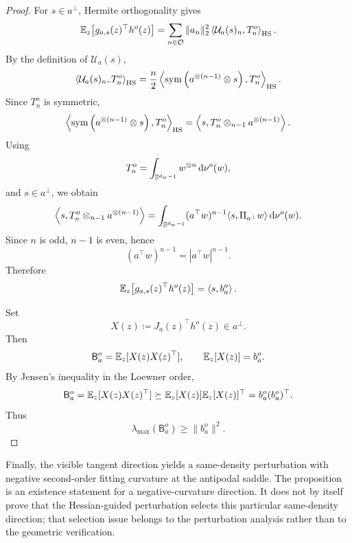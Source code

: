 \begin{proof}
For \(s\in a^\perp\), Hermite orthogonality gives
\[
    \mathbb{E}_z\bigl[g_{a,s}(z)^\top h^o(z)\bigr]
    =
    \sum_{n\in\mathcal O}
    \|a_n\|_2^2
    \left\langle
        \mathcal U_a(s)_n,T_n^o
    \right\rangle_{\mathrm{HS}}.
\]
By the definition of \(\mathcal U_a(s)\),
\[
    \left\langle
        \mathcal U_a(s)_n,T_n^o
    \right\rangle_{\mathrm{HS}}
    =
    \frac n2
    \left\langle
        \mathrm{sym}\left({a^{\otimes(n-1)}\otimes s}\right),
        T_n^o
    \right\rangle_{\mathrm{HS}}.
\]
Since \(T_n^o\) is symmetric,
\[
    \left\langle
        \mathrm{sym}\left({a^{\otimes(n-1)}\otimes s}\right),
        T_n^o
    \right\rangle_{\mathrm{HS}}
    =
    \left\langle
        s,
        T_n^o\otimes_{n-1}a^{\otimes(n-1)}
    \right\rangle.
\]
Using
\[
    T_n^o
    =
    \int_{\mathbb{S}^{d_w-1}} w^{\otimes n}\,\dd\nu^o(w),
\]
and \(s\in a^\perp\), we obtain
\[
    \left\langle
        s,
        T_n^o\otimes_{n-1}a^{\otimes(n-1)}
    \right\rangle
    =
    \int_{\mathbb{S}^{d_w-1}}
    (a^\top w)^{n-1}
    \langle s,\Pi_{a^\perp}w\rangle
    \,\dd\nu^o(w).
\]
Since \(n\) is odd, \(n-1\) is even, hence
\[
    (a^\top w)^{n-1}
    =
    |a^\top w|^{n-1}.
\]
Therefore
\[
    \mathbb{E}_z\bigl[g_{a,s}(z)^\top h^o(z)\bigr]
    =
    \left\langle s,b_a^o\right\rangle.
\]

Set
\[
    X(z)\coloneq J_a(z)^\top h^o(z)\in a^\perp.
\]
Then
\[
    \mathsf B_a^o=\mathbb{E}_z[X(z)X(z)^\top],
    \qquad
    \mathbb{E}_z[X(z)]=b_a^o.
\]
By Jensen's inequality in the Loewner order,
\[
    \mathsf B_a^o
    =
    \mathbb{E}_z[X(z)X(z)^\top]
    \succeq
    \mathbb{E}_z[X(z)]\mathbb{E}_z[X(z)]^\top
    =
    b_a^o(b_a^o)^\top.
\]
Thus
\[
    \lambda_{\max}(\mathsf B_a^o)\ge\|b_a^o\|^2.
\]
\end{proof}

Finally, the visible tangent direction yields a same-density perturbation with negative second-order fitting curvature at the antipodal saddle.
The proposition is an existence statement for a negative-curvature direction.
It does not by itself prove that the Hessian-guided perturbation selects this
particular same-density direction; that selection issue belongs to the
perturbation analysis rather than to the geometric verification.

